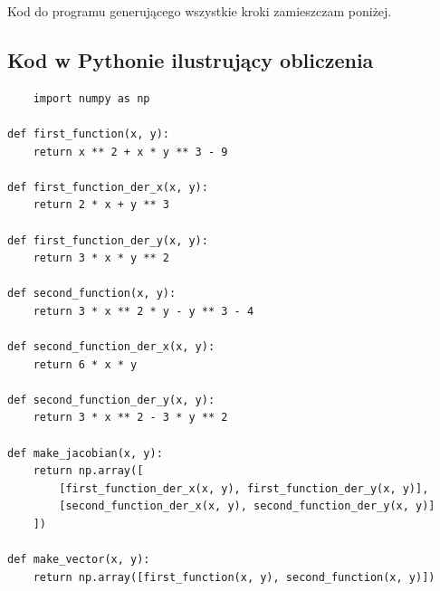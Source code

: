 \documentclass[a4paper,12pt]{article}
\begin{document}
Kod do programu generującego wszystkie kroki zamieszczam poniżej.


\subsection*{Kod w Pythonie ilustrujący obliczenia}

\begin{lstlisting}
    import numpy as np

def first_function(x, y):
    return x ** 2 + x * y ** 3 - 9 
        
def first_function_der_x(x, y):
    return 2 * x + y ** 3 

def first_function_der_y(x, y):
    return 3 * x * y ** 2

def second_function(x, y):
    return 3 * x ** 2 * y - y ** 3 - 4

def second_function_der_x(x, y):
    return 6 * x * y

def second_function_der_y(x, y):
    return 3 * x ** 2 - 3 * y ** 2

def make_jacobian(x, y):
    return np.array([
        [first_function_der_x(x, y), first_function_der_y(x, y)],
        [second_function_der_x(x, y), second_function_der_y(x, y)]
    ])

def make_vector(x, y):
    return np.array([first_function(x, y), second_function(x, y)])


\end{lstlisting}
\end{document}
